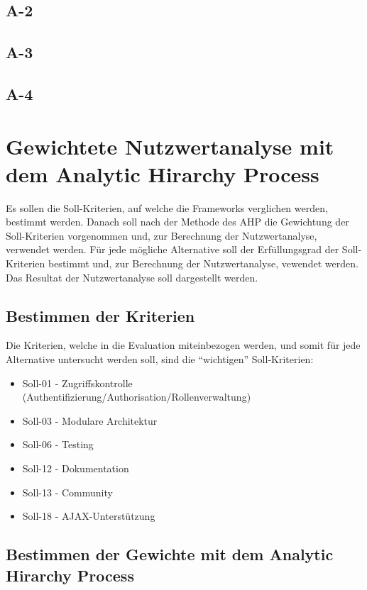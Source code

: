   \subsection{A-2}
  
  \subsection{A-3}

  \subsection{A-4}
    
  \section{Gewichtete Nutzwertanalyse mit dem Analytic Hirarchy Process}
  
  Es sollen die Soll-Kriterien, auf welche die Frameworks verglichen werden,
  bestimmt werden. Danach soll nach der Methode des \ac{AHP} die Gewichtung der
  Soll-Kriterien vorgenommen und, zur Berechnung der Nutzwertanalyse,
  verwendet werden. Für jede mögliche Alternative soll der Erfüllungsgrad der
  Soll-Kriterien bestimmt und, zur Berechnung der Nutzwertanalyse, vewendet
  werden. Das Resultat der Nutzwertanalyse soll dargestellt werden.
  
  \subsection{Bestimmen der Kriterien}
  
  Die Kriterien, welche in die Evaluation miteinbezogen werden, und somit für
  jede Alternative untersucht werden soll, sind die ``wichtigen''
  Soll-Kriterien:
  
  \begin{itemize}
    \item Soll-01 - Zugriffskontrolle 
    (Authentifizierung/Authorisation/Rollenverwaltung)
    \item Soll-03 - Modulare Architektur
    \item Soll-06 - Testing
    \item Soll-12 - Dokumentation
    \item Soll-13 - Community
    \item Soll-18 - AJAX-Unterstützung
  \end{itemize}
  
  \subsection{Bestimmen der Gewichte mit dem Analytic Hirarchy Process}
  
